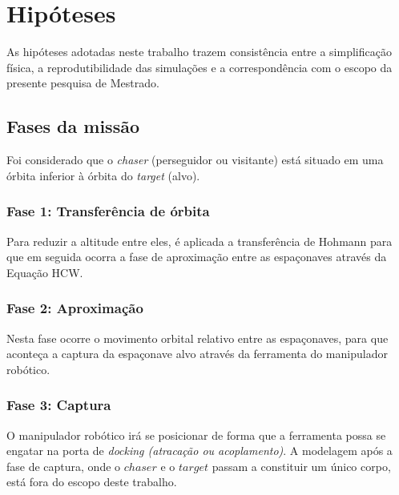 \section{Hipóteses}
As hipóteses adotadas neste trabalho trazem consistência entre a simplificação física, a reprodutibilidade das simulações e a correspondência com o escopo da presente pesquisa de Mestrado.

\subsection{Fases da missão}
\label{sec:fases_missao}
Foi considerado que o \emph{chaser} (perseguidor ou visitante) está situado em uma órbita inferior à órbita do \emph{target} (alvo).

\subsubsection{Fase 1: Transferência de órbita}
Para reduzir a altitude entre eles, é aplicada a transferência de Hohmann para que em seguida ocorra a fase de aproximação entre as espaçonaves através da Equação HCW.

\subsubsection{Fase 2: Aproximação}
Nesta fase ocorre o movimento orbital relativo entre as espaçonaves, para que aconteça a captura da espaçonave alvo através da ferramenta do manipulador robótico.

\subsubsection{Fase 3: Captura}
O manipulador robótico irá se posicionar de forma que a ferramenta possa se engatar na porta de \emph{docking (atracação ou acoplamento)}.
A modelagem após a fase de captura, onde o $chaser$ e o $target$ passam a constituir um único corpo, está fora do escopo deste trabalho.


